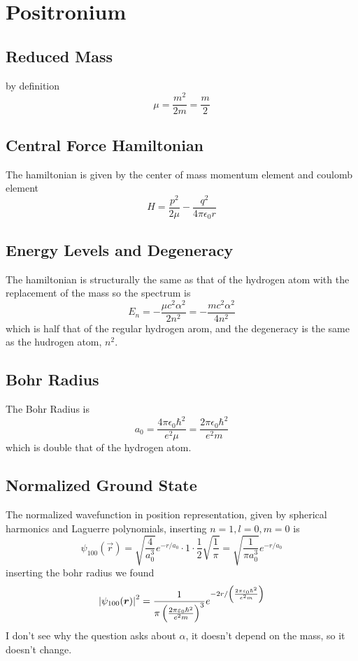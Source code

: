 \clearpage
\section{Positronium}
\subsection{Reduced Mass}
by definition
\begin{equation}
    \mu = \frac{m^2}{2m} = \frac{m}{2}
\end{equation}
\subsection{Central Force Hamiltonian}
The hamiltonian is given by the center of mass momentum element and coulomb element
\begin{equation}
    H = \frac{p^2}{2\mu} - \frac{q^2}{4\pi\epsilon_0 r}
\end{equation}
\subsection{Energy Levels and Degeneracy}
The hamiltonian is structurally the same as that of the hydrogen atom with the replacement of the mass so the spectrum is
\begin{equation}
    E_n = -\frac{\mu c^2 \alpha^2}{2n^2} = -\frac{mc^2 \alpha^2}{4n^2}
\end{equation}
which is half that of the regular hydrogen arom, and the degeneracy is the same as the hudrogen atom, \(n^2\).
\subsection{Bohr Radius}
The Bohr Radius is
\begin{equation}
    a_0 = \frac{4\pi\epsilon_0 \hbar^2}{e^2 \mu} = \frac{2\pi\epsilon_0 \hbar^2}{e^2 m} 
\end{equation}
which is double that of the hydrogen atom.
\subsection{Normalized Ground State}
The normalized wavefunction in position representation, given by spherical harmonics and Laguerre polynomials, inserting \(n=1, l=0, m=0\) is
\begin{equation}
    \psi_{100}(\vec{r}) = \sqrt{\frac{4}{a_0^3}} e^{-r/a_0} \cdot 1 \cdot \frac{1}{2}\sqrt{\frac{1}{\pi}} = \sqrt{\frac{1}{\pi a_0^3}} e^{-r/a_0} 
\end{equation}
inserting the bohr radius we found
\begin{equation}
    \left\lvert\psi_{100}(\bm{r})\right\rvert^2 = \frac{1}{\pi \left(\frac{2\pi\varepsilon_0 \hbar^2}{e^2 m} \right)^3} e^{-2r/\left(\frac{2\pi\varepsilon_0 \hbar^2}{e^2 m} \right)} 
\end{equation}
I don't see why the question asks about \(\alpha\), it doesn't depend on the mass, so it doesn't change.
